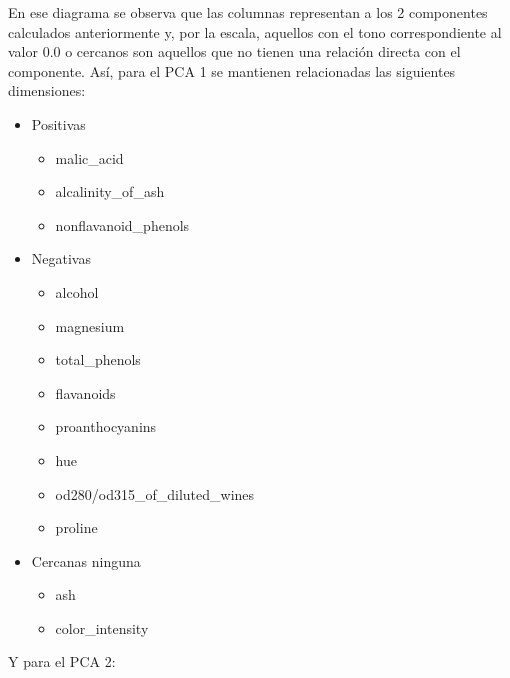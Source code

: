 En ese diagrama se observa que las columnas representan a los 2 componentes calculados anteriormente y, por la escala, aquellos con el tono correspondiente al valor 0.0 o cercanos son aquellos que no tienen una relación directa con el componente.
Así, para el PCA 1 se mantienen relacionadas las siguientes dimensiones:
\begin{itemize}
    \item Positivas
    \begin{itemize}
        \item malic\_acid
        \item alcalinity\_of\_ash
        \item nonflavanoid\_phenols
    \end{itemize}                                                                                                                                                                                                                                                                                                                                                                                                                                                                                                                                                                    
    \item Negativas
    \begin{itemize}
        \item alcohol
        \item magnesium
        \item total\_phenols
        \item flavanoids
        \item proanthocyanins
        \item hue
        \item od280/od315\_of\_diluted\_wines
        \item proline
    \end{itemize}
    \item Cercanas ninguna
    \begin{itemize}
        \item ash
        \item color\_intensity
    \end{itemize}
\end{itemize}
Y para el PCA 2:
